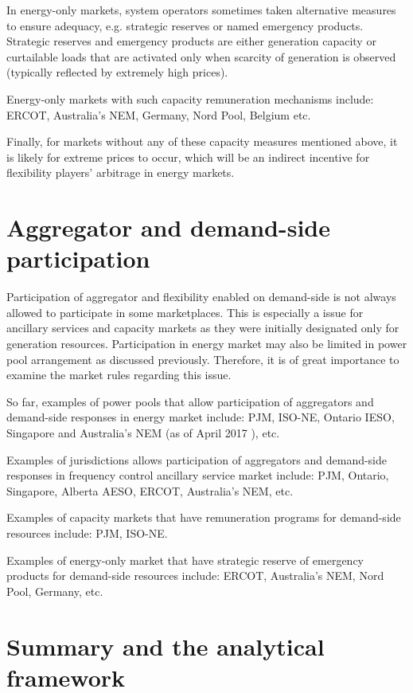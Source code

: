 In energy-only markets, system operators sometimes taken alternative measures to ensure adequacy, e.g. strategic reserves or named emergency products. Strategic reserves and emergency products are either generation capacity or curtailable loads that are activated only when scarcity of generation is observed (typically reflected by extremely high prices).

Energy-only markets with such capacity remuneration mechanisms include: ERCOT, Australia's NEM, Germany, Nord Pool, Belgium etc. 

Finally, for markets without any of these capacity measures mentioned above, it is likely for extreme prices to occur, which will be an indirect incentive for flexibility players' arbitrage in energy markets.

\section{Aggregator and demand-side participation}

Participation of aggregator and flexibility enabled on demand-side is not always allowed to participate in some marketplaces. This is especially a issue for ancillary services and capacity markets as they were initially designated only for generation resources. Participation in energy market may also be limited in power pool arrangement as discussed previously. Therefore, it is of great importance to examine the market rules regarding this issue.

So far, examples of power pools that allow participation of aggregators and demand-side responses in energy market include: PJM, ISO-NE, Ontario IESO, Singapore and Australia's NEM (as of April 2017 \cite{AEMO_DR}), etc.

Examples of jurisdictions allows participation of aggregators and demand-side responses in frequency control ancillary service market include: PJM, Ontario, Singapore, Alberta AESO, ERCOT, Australia's NEM, etc.

Examples of capacity markets that have remuneration programs for demand-side resources include: PJM, ISO-NE.

Examples of energy-only market that have strategic reserve of emergency products for demand-side resources include: ERCOT, Australia's NEM, Nord Pool, Germany, etc.

\section{Summary and the analytical framework}

